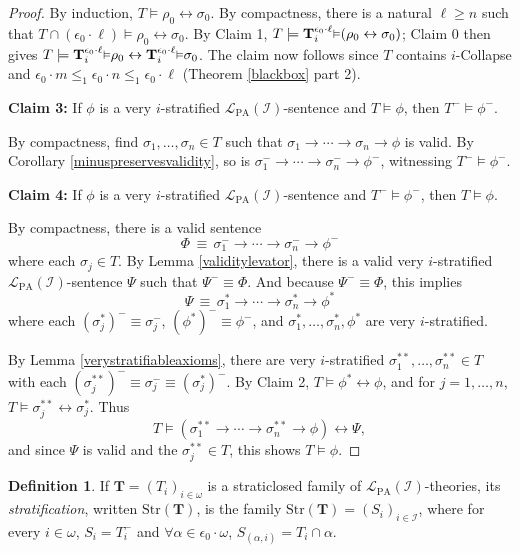 \documentclass[reqno]{article}
\theoremstyle{definition}
\newtheorem{definition}[theorem]{Definition}
\def\L{\mathscr{L}}
\def\T{\mathbf{T}}
\def\LPA{\L_{\mathrm{PA}}}
\def\epom{\epsilon_0\cdot\omega}
\def\indset{\mathcal I}
\newcommand{\Prr}[2]{\T^{#1}_{#2}\mbox{\small${\vDash}$}}
\newcommand{\claim}[1]{\textbf{Claim #1:}}
\newcommand{\str}[1]{\mathrm{Str}(#1)} \newcommand{\Str}[1]{\str{#1}}
\begin{document}
\begin{proof}
By induction, $T\models\rho_0\leftrightarrow\sigma_0$.
By compactness, there is a natural $\ell\geq n$
such that $T\cap 
(\epsilon_0\cdot\ell)\models\rho_0\leftrightarrow\sigma_0$.
By Claim 1, $T\models 
\Prr{\epsilon_0\cdot\ell}i(\rho_0\leftrightarrow\sigma_0)$;
Claim 0 then gives $T\models \Prr{\epsilon_0\cdot\ell}i\rho_0
\leftrightarrow \Prr{\epsilon_0\cdot\ell}i\sigma_0$.
The claim now follows since $T$ contains $i$-Collapse
and $\epsilon_0\cdot m\leq_1\epsilon_0\cdot n\leq_1 \epsilon_0\cdot \ell$ (Theorem \ref{blackbox} part 2).

\item
\claim3
If $\phi$ is a very $i$-stratified $\LPA(\indset)$-sentence
and $T\models\phi$, then $T^-\models\phi^-$.

\item
By compactness, find 
$\sigma_1,\ldots,\sigma_n\in T$ such that
$\sigma_1\rightarrow\cdots\rightarrow\sigma_n\rightarrow\phi$
is valid.
By Corollary \ref{minuspreservesvalidity},
so is $\sigma^-_1\rightarrow\cdots\rightarrow\sigma^-_n\rightarrow\phi^-$,
witnessing $T^-\models\phi^-$.

\item
\claim4
If $\phi$ is a very $i$-stratified $\LPA(\indset)$-sentence
and $T^-\models\phi^-$, then $T\models\phi$.

\item
By compactness,
there is a valid sentence
\[
\Phi\,\equiv\,\sigma^-_1\rightarrow\cdots\rightarrow\sigma^-_n\rightarrow\phi^-\]
where each $\sigma_j\in T$.
By Lemma \ref{validitylevator},
there is a valid very $i$-stratified $\LPA(\indset)$-sentence $\Psi$
such that $\Psi^-\equiv\Phi$.
And because $\Psi^-\equiv\Phi$, this implies
\[
\Psi\,\equiv\,\sigma^*_1\rightarrow\cdots\rightarrow\sigma^*_n\rightarrow\phi^*
\]
where each $(\sigma^*_j)^-\equiv\sigma^-_j$, $(\phi^*)^-\equiv\phi^-$,
and $\sigma^*_1,\ldots,\sigma^*_n,\phi^*$ are very $i$-stratified.

By Lemma \ref{verystratifiableaxioms},
there are very $i$-stratified
$\sigma^{**}_1,\ldots,\sigma^{**}_n\in T$ with each $(\sigma^{**}_j)^-\equiv \sigma^-_j\equiv (\sigma^*_j)^-$.
By Claim 2, $T\models\phi^*\leftrightarrow\phi$, and for $j=1,\ldots,n$, $T\models \sigma^{**}_j\leftrightarrow \sigma^*_j$.
Thus
\[
T\models (\sigma^{**}_1\rightarrow\cdots\rightarrow\sigma^{**}_n\rightarrow\phi)\leftrightarrow\Psi,
\]
and since $\Psi$ is valid and the $\sigma^{**}_j\in T$, this shows $T\models\phi$.
\end{proof}


\begin{definition}
\label{stratdefn}
If $\T=(T_i)_{i\in\omega}$ is a straticlosed family of $\LPA(\indset)$-theories,
its
\emph{stratification}, written $\str{\T}$,
is the family $\str{\T}=(S_i)_{i\in\indset}$, where for every $i\in\omega$,
$S_i=T^-_i$ and $\forall\alpha\in\epom$, $S_{(\alpha,i)}=T_i\cap\alpha$.
\end{definition}
\end{document}
